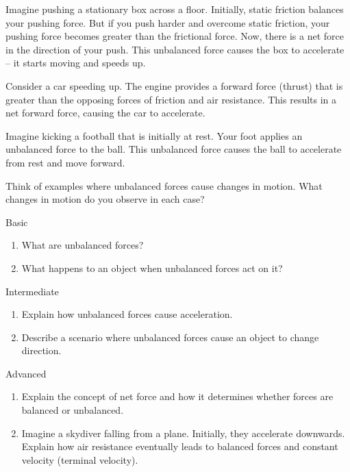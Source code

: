 Imagine pushing a stationary box across a floor.  Initially, static friction balances your pushing force.  But if you push harder and overcome static friction, your pushing force becomes greater than the frictional force.  Now, there is a net force in the direction of your push.  This unbalanced force causes the box to accelerate – it starts moving and speeds up.

Consider a car speeding up.  The engine provides a forward force (thrust) that is greater than the opposing forces of friction and air resistance.  This results in a net forward force, causing the car to accelerate.

\begin{example}
Imagine kicking a football that is initially at rest.  Your foot applies an unbalanced force to the ball.  This unbalanced force causes the ball to accelerate from rest and move forward.
\end{example}

\begin{stopandthink}
Think of examples where unbalanced forces cause changes in motion. What changes in motion do you observe in each case?
\end{stopandthink}

\begin{tieredquestions}{Basic}
\begin{enumerate}
    \item What are unbalanced forces?
    \item What happens to an object when unbalanced forces act on it?
\end{enumerate}
\end{tieredquestions}

\begin{tieredquestions}{Intermediate}
\begin{enumerate}
    \item Explain how unbalanced forces cause acceleration.
    \item Describe a scenario where unbalanced forces cause an object to change direction.
\end{enumerate}
\end{tieredquestions}

\begin{tieredquestions}{Advanced}
\begin{enumerate}
    \item  Explain the concept of net force and how it determines whether forces are balanced or unbalanced.
    \item  Imagine a skydiver falling from a plane.  Initially, they accelerate downwards.  Explain how air resistance eventually leads to balanced forces and constant velocity (terminal velocity).
\end{enumerate}
\end{tieredquestions}


